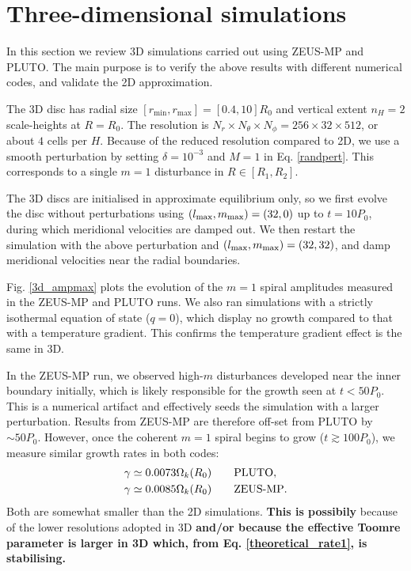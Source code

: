 \section{Three-dimensional simulations}\label{results3d}
In this section we review 3D simulations carried 
out using ZEUS-MP and PLUTO. The main purpose is to verify 
the above results with different numerical codes, and validate  
the 2D approximation.    

The 3D disc has radial size
$[r_\mathrm{min},r_\mathrm{max}]=[0.4,10]R_0$ and vertical extent  
$n_H=2$ scale-heights at $R=R_0$. The resolution is $N_r\times N_\theta\times
N_\phi=256\times32\times512$, or about $4$ cells per
$H$. Because of the reduced resolution 
compared to 2D, we use a smooth perturbation by setting
$\delta = 10^{-3}$ and $M=1$ in Eq. \ref{randpert}. This corresponds
to a single $m=1$ disturbance in $R\in[R_1,R_2]$.


The 3D discs are initialised in approximate equilibrium only, so we
first evolve the disc without perturbations using  
$(l_\mathrm{max},m_\mathrm{max})=(32,0)$ up to $t=10P_0$, during which 
meridional velocities are damped out. We then restart the simulation
with the above perturbation and $(l_\mathrm{max},m_\mathrm{max})=(32,32)$, and damp
meridional velocities near the radial boundaries. 

Fig. \ref{3d_ampmax} plots the evolution of the $m=1$ spiral amplitudes measured
in the ZEUS-MP and PLUTO runs. We also ran simulations
with a strictly isothermal equation of state ($q=0$), which display no
growth compared to that with a temperature gradient.  This confirms
the temperature gradient effect is the same in 3D. 


In the ZEUS-MP run, we observed high-$m$ disturbances developed near 
the inner boundary initially, which is likely responsible for the
growth seen at $t<50P_0$. This is a numerical artifact and effectively
seeds the simulation with a larger perturbation. Results
from ZEUS-MP are therefore off-set from PLUTO by $\sim50P_0$. However,
once the coherent $m=1$ spiral begins to grow ($t\gtrsim 100P_0$), 
we measure similar growth rates in both codes: 
\begin{align*}
  &\gamma \simeq 0.0073\Omega_k(R_0) \quad\quad \mathrm{PLUTO},\\
  &\gamma \simeq 0.0085\Omega_k(R_0) \quad\quad {\operatorname{ZEUS-MP}}.
\end{align*}
Both are somewhat smaller than the 2D simulations. {\bf This is
  possibily} because of the lower resolutions adopted in 3D {\bf
  and/or because the effective Toomre parameter is larger in 3D
  \citep{mamat10} which, from Eq. \ref{theoretical_rate1}, is
  stabilising.}  

